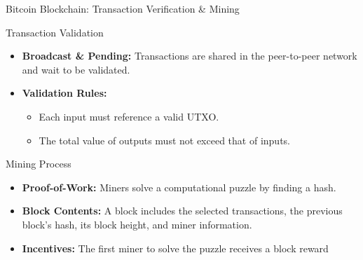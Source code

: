 \documentclass{beamer}
\begin{document}
\begin{frame}{Bitcoin Blockchain: Transaction Verification \& Mining}
    \footnotesize

    \begin{block}{Transaction Validation}
        \begin{itemize}
            \item \textbf{Broadcast \& Pending:} Transactions are shared in the peer-to-peer network and wait to be validated.
            \item \textbf{Validation Rules:}
                  \begin{itemize}
                      \item Each input must reference a valid UTXO.
                      \item The total value of outputs must not exceed that of inputs.
                  \end{itemize}
        \end{itemize}
    \end{block}

    \begin{block}{Mining Process}
        \begin{itemize}
            \item \textbf{Proof-of-Work:} Miners solve a computational puzzle by finding a hash.
            \item \textbf{Block Contents:} A block includes the selected transactions, the previous block's hash, its block height, and miner information.
            \item \textbf{Incentives:} The first miner to solve the puzzle receives a block reward
        \end{itemize}
    \end{block}
\end{frame}
\end{document}
